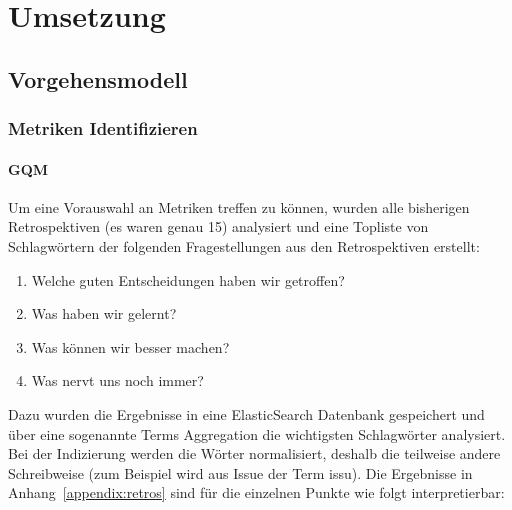 \chapter{Umsetzung}

\section{Vorgehensmodell}

\subsection{Metriken Identifizieren}

\subsubsection{\ac{GQM}}

Um eine Vorauswahl an Metriken treffen zu können, wurden alle bisherigen Retrospektiven (es waren genau 15) analysiert und eine Topliste von Schlagwörtern der folgenden Fragestellungen aus den Retrospektiven erstellt:
\begin{enumerate}
    \item Welche guten Entscheidungen haben wir getroffen?
    \item Was haben wir gelernt?
    \item Was können wir besser machen?
    \item Was nervt uns noch immer?
\end{enumerate}

Dazu wurden die Ergebnisse in eine ElasticSearch Datenbank gespeichert und über eine sogenannte Terms Aggregation die wichtigsten Schlagwörter analysiert.
Bei der Indizierung werden die Wörter normalisiert, deshalb die teilweise andere Schreibweise (zum Beispiel wird aus Issue der Term issu).
Die Ergebnisse in Anhang~\ref{appendix:retros} sind für die einzelnen Punkte wie folgt interpretierbar:

